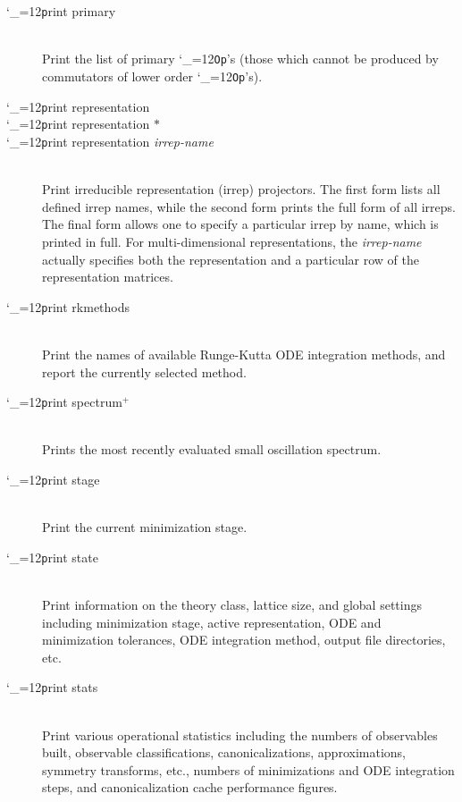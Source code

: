 \documentclass [12pt]{article}
\makeatletter
\renewcommand{\tt}{\begingroup\catcode`_=12\def\_{\string_}\tt@}
\newcommand{\tt@}[1]{\texttt{#1}\endgroup}
\makeatother
\begin{document}
\begin{description}
\item [\tt print primary]~\\
    Print the list of primary \tt{Op}'s (those which cannot be
    produced by commutators of lower order \tt{Op}'s).

\item [\tt print representation] \bgroup \itemsep 0pt \parskip 0pt
\item [\tt print representation $*$]
\item [\tt print representation {\it irrep-name}]~\\
    Print irreducible representation (irrep) projectors.
    The first form lists all defined irrep names,
    while the second form prints the full form of all irreps.
    The final form allows one to specify a particular irrep by name,
    which is printed in full.
    For multi-dimensional representations, the \textit{irrep-name} actually
    specifies both the representation and a particular row of the
    representation matrices.
    
\egroup

\item [\tt print rkmethods]~\\
    Print the names of available Runge-Kutta ODE integration methods,
    and report the currently selected method.

\item [\tt print spectrum$^+$]~\\
    Prints the most recently evaluated small oscillation spectrum.

\item [\tt print stage]~\\
    Print the current minimization stage.

\item [\tt print state]~\\
    Print information on the theory class, lattice size,
    and global settings including
    minimization stage, active representation,
    ODE and minimization tolerances, ODE integration method,
    output file directories, etc.

\item [\tt print stats]~\\
    Print various operational statistics including the
    numbers of observables built, observable classifications,
    canonicalizations,
    approximations, symmetry transforms, etc., 
    numbers of minimizations and ODE integration steps,
    and canonicalization cache performance figures.


\end{description}
\end{document}
